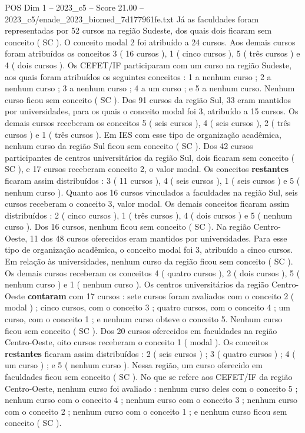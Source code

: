 \begin{textsample}{POS Dim 1 – 2023\_c5 – Score 21.00 – 2023\_c5/enade\_2023\_biomed\_7d177961fe.txt}
Já as faculdades foram representadas por 52 cursos na região Sudeste, dos quais dois ficaram sem conceito ( SC ).
O conceito modal 2 foi atribuído a 24 cursos.
Aos demais cursos foram atribuídos os conceitos 3 ( 16 cursos ), 1 ( cinco cursos ), 5 ( três cursos ) e 4 ( dois cursos ).
Os CEFET/IF participaram com um curso na região Sudeste, aos quais foram atribuídos os seguintes conceitos : 1 a nenhum curso ; 2 a nenhum curso ; 3 a nenhum curso ; 4 a um curso ; e 5 a nenhum curso.
Nenhum curso ficou sem conceito ( SC ).
Dos 91 cursos da região Sul, 33 eram mantidos por universidades, para os quais o conceito modal foi 3, atribuído a 15 cursos.
Os demais cursos receberam os conceitos 5 ( seis cursos ), 4 ( seis cursos ), 2 ( três cursos ) e 1 ( três cursos ).
Em IES com esse tipo de organização acadêmica, nenhum curso da região Sul ficou sem conceito ( SC ).
Dos 42 cursos participantes de centros universitários da região Sul, dois ficaram sem conceito ( SC ), e 17 cursos receberam conceito 2, o valor modal.
Os conceitos \textbf{restantes} ficaram assim distribuídos : 3 ( 11 cursos ), 4 ( seis cursos ), 1 ( seis cursos ) e 5 ( nenhum curso ).
Quanto aos 16 cursos vinculados a faculdades na região Sul, seis cursos receberam o conceito 3, valor modal.
Os demais conceitos ficaram assim distribuídos : 2 ( cinco cursos ), 1 ( três cursos ), 4 ( dois cursos ) e 5 ( nenhum curso ).
Dos 16 cursos, nenhum ficou sem conceito ( SC ).
Na região Centro-Oeste, 11 dos 48 cursos oferecidos eram mantidos por universidades.
Para esse tipo de organização acadêmica, o conceito modal foi 3, atribuído a cinco cursos.
Em relação às universidades, nenhum curso da região ficou sem conceito ( SC ).
Os demais cursos receberam os conceitos 4 ( quatro cursos ), 2 ( dois cursos ), 5 ( nenhum curso ) e 1 ( nenhum curso ).
Os centros universitários da região Centro-Oeste \textbf{contaram} com 17 cursos : sete cursos foram avaliados com o conceito 2 ( modal ) ; cinco cursos, com o conceito 3 ; quatro cursos, com o conceito 4 ; um curso, com o conceito 1 ; e nenhum curso obteve o conceito 5.
Nenhum curso ficou sem conceito ( SC ).
Dos 20 cursos oferecidos em faculdades na região Centro-Oeste, oito cursos receberam o conceito 1 ( modal ).
Os conceitos \textbf{restantes} ficaram assim distribuídos : 2 ( seis cursos ) ; 3 ( quatro cursos ) ; 4 ( um curso ) ; e 5 ( nenhum curso ).
Nessa região, um curso oferecido em faculdades ficou sem conceito ( SC ).
No que se refere aos CEFET/IF da região Centro-Oeste, nenhum curso foi avaliado : nenhum curso deles com o conceito 5 ; nenhum curso com o conceito 4 ; nenhum curso com o conceito 3 ; nenhum curso com o conceito 2 ; nenhum curso com o conceito 1 ; e nenhum curso ficou sem conceito ( SC ).

\end{textsample}
